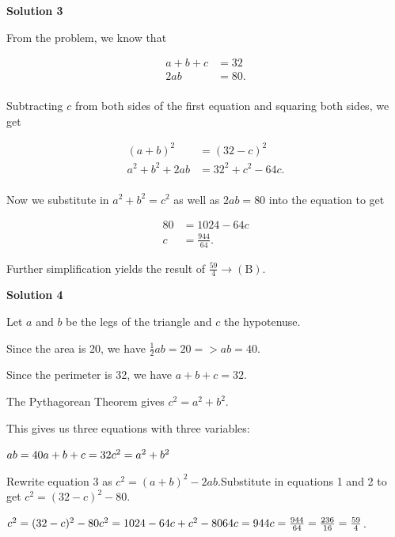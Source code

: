 \begin{enumerate}
 



\textbf{Solution 3}

From the problem, we know that 

 
 \begin{align*} a+b+c &= 32 \\ 2ab &= 80. \\ \end{align*}


 Subtracting $c$ from both sides of the first equation and squaring both sides, we get

 
 \begin{align*} (a+b)^2 &= (32 - c)^2\\ a^2 + b^2 + 2ab &= 32^2 + c^2 - 64c.\\ \end{align*}


 Now we substitute in $a^2 + b^2 = c^2$ as well as $2ab = 80$ into the equation to get

 
 \begin{align*} 80 &= 1024 - 64c\\ c &= \frac{944}{64}. \end{align*}


 Further simplification yields the result of $\frac{59}{4} \rightarrow \mathrm{(B)}$.

 



\textbf{Solution 4}

Let $a$ and $b$ be the legs of the triangle and $c$ the hypotenuse.

 Since the area is 20, we have $\frac{1}{2}ab = 20 => ab=40$.

 Since the perimeter is 32, we have $a + b + c = 32$.

 The Pythagorean Theorem gives $c^2 = a^2 + b^2$. 

 This gives us three equations with three variables:

 $ab = 40 \\ a + b + c = 32 \\ c^2 = a^2 + b^2$

 Rewrite equation 3 as $c^2 = (a+b)^2 - 2ab$.Substitute in equations 1 and 2 to get $c^2 = (32-c)^2 - 80$.

 $c^2 = (32-c)^2 - 80 \\\\ c^2 = 1024 - 64c + c^2 - 80 \\\\ 64c = 944 \\\\ c = \frac{944}{64} = \frac{236}{16} = \frac{59}{4}$. 


\end{enumerate}
